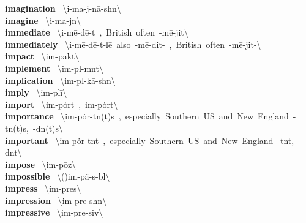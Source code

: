 \documentclass[10pt,a4paper]{article}
\begin{document}
\begin{multicols}{2}
\textbf{ imagination }\quad \ \textbackslash i-\textsecstress ma-j\textschwa -\textprimstress n\={a}-sh\textschwa n\textbackslash \\
\textbf{ imagine }\quad \ \textbackslash i-\textprimstress ma-j\textschwa n\textbackslash \\
\textbf{ immediate }\quad \ \textbackslash i-\textprimstress m\={e}-d\={e}-\textschwa t\ ,\ British\ often\ -\textprimstress m\={e}-jit\textbackslash \\
\textbf{ immediately }\quad \ \textbackslash i-\textprimstress m\={e}-d\={e}-\textschwa t-l\={e}\ also\ -\textprimstress m\={e}-dit-\ ,\ British\ often\ -\textprimstress m\={e}-jit-\textbackslash \\
\textbf{ impact }\quad \ \textbackslash im-\textprimstress pakt\textbackslash \\
\textbf{ implement }\quad \ \textbackslash \textprimstress im-pl\textschwa -m\textschwa nt\textbackslash \\
\textbf{ implication }\quad \ \textbackslash \textsecstress im-pl\textschwa -\textprimstress k\={a}-sh\textschwa n\textbackslash \\
\textbf{ imply }\quad \ \textbackslash im-\textprimstress pl\={i}\textbackslash \\
\textbf{ import }\quad \ \textbackslash im-\textprimstress p\.{o}rt\ ,\ \textprimstress im-\textsecstress p\.{o}rt\textbackslash \\
\textbf{ importance }\quad \ \textbackslash im-\textprimstress p\.{o}r-t\textsuperscript{\textreve}n(t)s\ ,\ especially\ Southern\ US\ and\ New\ England\ -t\textschwa n(t)s,\ -d\textschwa n(t)s\textbackslash \\
\textbf{ important }\quad \ \textbackslash im-\textprimstress p\.{o}r-t\textsuperscript{\textreve}nt\ ,\ especially\ Southern\ US\ and\ New\ England\ -t\textschwa nt,\ -d\textschwa nt\textbackslash \\
\textbf{ impose }\quad \ \textbackslash im-\textprimstress p\={o}z\textbackslash \\
\textbf{ impossible }\quad \ \textbackslash (\textsecstress )im-\textprimstress p\"{a}-s\textschwa -b\textschwa l\textbackslash \\
\textbf{ impress }\quad \ \textbackslash im-\textprimstress pres\textbackslash \\
\textbf{ impression }\quad \ \textbackslash im-\textprimstress pre-sh\textschwa n\textbackslash \\
\textbf{ impressive }\quad \ \textbackslash im-\textprimstress pre-siv\textbackslash \\

\end{multicols}
\end{document}
